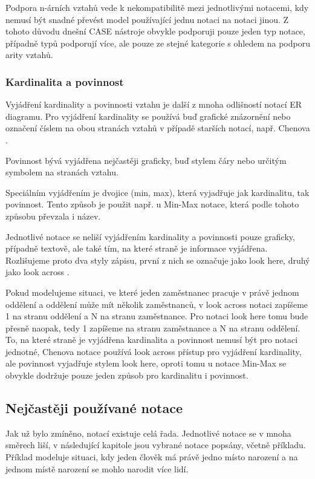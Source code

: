 \documentclass[czech,bachelor,public,dept460,male,oneside]{diploma}
\begin{document}
	Podpora n-árních vztahů vede k nekompatibilitě mezi jednotlivými notacemi, kdy nemusí být snadné převést model používající jednu notaci na notaci jinou. Z tohoto důvodu dnešní CASE nástroje obvykle podporuji pouze jeden typ notace, případně typů podporují více, ale pouze ze stejné kategorie s ohledem na podporu arity vztahů. 
	
	\subsubsection{Kardinalita a povinnost}
	Vyjádření kardinality a povinnosti vztahu je další z mnoha odlišností notací ER diagramu. Pro vyjádření kardinality se používá buď grafické znázornění nebo označení číslem na obou stranách vztahů v případě starších notací, např. Chenova \cite{dbVsb}. 
	
	Povinnost bývá vyjádřena nejčastěji graficky, buď stylem čáry nebo určitým symbolem na stranách vztahu. 
	
	Speciálním vyjádřením je dvojice (min, max), která vyjadřuje jak kardinalitu, tak povinnost. Tento způsob je použit např. u Min-Max notace, která podle tohoto způsobu převzala i název. 
	
	Jednotlivé notace se neliší vyjádřením kardinality a povinnosti pouze graficky, případně textově, ale také tím, na které straně je informace vyjádřena. Rozlišujeme proto dva styly zápisu, první z nich se označuje jako look here, druhý jako look across \cite{compErNotations}. 
	
	Pokud modelujeme situaci, ve které jeden zaměstnanec pracuje v právě jednom oddělení a oddělení může mít několik zaměstnanců, v look across notaci zapíšeme 1 na stranu oddělení a N na stranu zaměstnance. Pro notaci look here tomu bude přesně naopak, tedy 1 zapíšeme na stranu zaměstnance a N na stranu oddělení. To, na které straně je vyjádřena kardinalita a povinnost nemusí být pro notaci jednotné, Chenova notace používá look across přístup pro vyjádření kardinality, ale povinnost vyjadřuje stylem look here, oproti tomu u notace Min-Max se obvykle dodržuje pouze jeden způsob pro kardinalitu i povinnost.
	
	\subsection{Nejčastěji používané notace} %
	Jak už bylo zmíněno, notací existuje celá řada. Jednotlivé notace se v mnoha směrech liší, v následující kapitole jsou vybrané notace popsány, včetně příkladu. Příklad modeluje situaci, kdy jeden člověk má právě jedno místo narození a na jednom místě narození se mohlo narodit více lidí.
	
\end{document}
